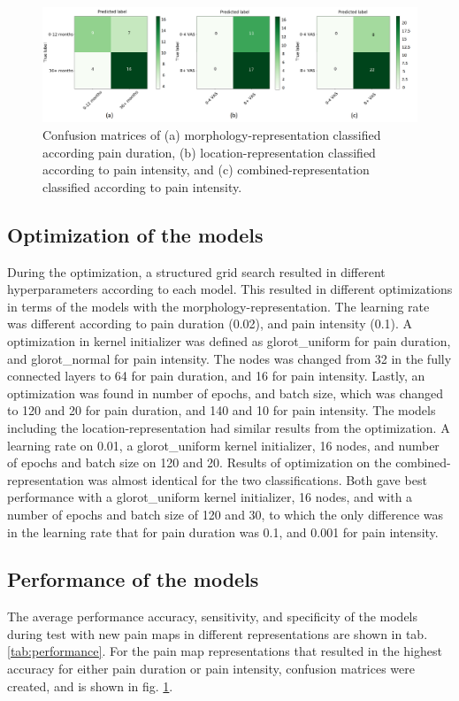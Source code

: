 \begin{figure} [b!]
\begin{tcolorbox}[colframe=black!30!black, colback=white]
    \includegraphics[width=1\textwidth]{Figures/samcon}
  \caption{Confusion matrices of (a) morphology-representation classified according pain duration, (b) location-representation classified according to pain intensity, and (c) combined-representation classified according to pain intensity.}
  \label{fig:confma}
\end{tcolorbox}
\end{figure}

\subsection*{Optimization of the models}
During the optimization, a structured grid search resulted in different hyperparameters according to each model. This resulted in different optimizations in terms of the models with the morphology-representation. The learning rate was different according to pain duration (0.02), and pain intensity (0.1). A optimization in kernel initializer was defined as glorot\_uniform for pain duration, and glorot\_normal for pain intensity. The nodes was changed from 32 in the fully connected layers to 64 for pain duration, and 16 for pain intensity. Lastly, an optimization was found in number of epochs, and batch size, which was changed to 120 and 20 for pain duration, and 140 and 10 for pain intensity. The models including the location-representation had similar results from the optimization. A learning rate on 0.01, a glorot\_uniform kernel initializer, 16 nodes, and number of epochs and batch size on 120 and 20. 
Results of optimization on the combined-representation was almost identical for the two classifications. Both gave best performance with a glorot\_uniform kernel initializer, 16 nodes, and with a number of epochs and batch size of 120 and 30, to which the only difference was in the learning rate that for pain duration was 0.1, and 0.001 for pain intensity.

\subsection*{Performance of the models}
The average performance accuracy, sensitivity, and specificity of the models during test with new pain maps in different representations are shown in tab. \ref{tab:performance}. \newline
For the pain map representations that resulted in the highest accuracy for either pain duration or pain intensity, confusion matrices were created, and is shown in fig. \ref{fig:confma}.